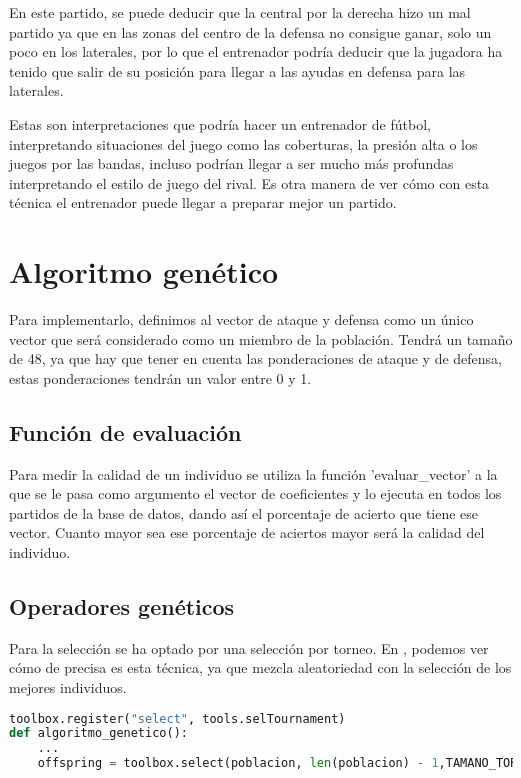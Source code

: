 En este partido, se puede deducir que la central por la derecha hizo un mal partido ya que en las zonas del centro de la defensa no consigue ganar, solo un poco en los laterales, por lo que el entrenador podría deducir que la jugadora ha tenido que salir de su posición para llegar a las ayudas en defensa para las laterales.

Estas son interpretaciones que podría hacer un entrenador de fútbol, interpretando situaciones del juego como las coberturas, la presión alta o los juegos por las bandas, incluso podrían llegar a ser mucho más profundas interpretando el estilo de juego del rival. Es otra manera de ver cómo con esta técnica el entrenador puede llegar a preparar mejor un partido.

\section{Algoritmo genético}

Para implementarlo, definimos al vector de ataque y defensa como un único vector que será considerado como un miembro de la población. Tendrá un tamaño de 48, ya que hay que tener en cuenta las ponderaciones de ataque y de defensa, estas ponderaciones tendrán un valor entre 0 y 1.

\subsection*{Función de evaluación}
Para medir la calidad de un individuo se utiliza la función 'evaluar\_vector' a la que se le pasa como argumento el vector de coeficientes y lo ejecuta en todos los partidos de la base de datos, dando así el porcentaje de acierto que tiene ese vector. Cuanto mayor sea ese porcentaje de aciertos mayor será la calidad del individuo.

\subsection*{Operadores genéticos}

Para la selección se ha optado por una selección por torneo. En \cite{algoritmo_genetico}, podemos ver cómo de precisa es esta técnica, ya que mezcla aleatoriedad con la selección de los mejores individuos.

\begin{lstlisting}[language=Python, caption={Selección por torneo}, label={lst:codigo-python}]
toolbox.register("select", tools.selTournament)
def algoritmo_genetico():
    ...
    offspring = toolbox.select(poblacion, len(poblacion) - 1,TAMANO_TORNEO)

\end{lstlisting}

